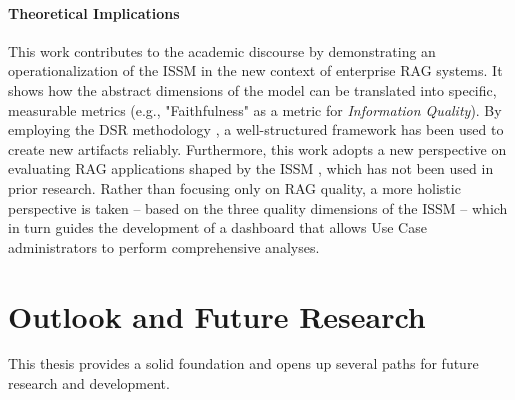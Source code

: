 \documentclass[
	english,
	ruledheaders=section,%
	class=report,%
	thesis={type=bachelor},%
	accentcolor=1b,%
	custommargins=true,%
	marginpar=false,%
	parskip=half-,%
	fontsize=11pt,%
	DIV=14,
]{tudapub}
\begin{document}
\paragraph{Theoretical Implications} This work contributes to the academic discourse by demonstrating an operationalization of the ISSM \parencite{DeloneMcLean2003ISSuccessTenYearUpdate} in the new context of enterprise RAG systems. It shows how the abstract dimensions of the model can be translated into specific, measurable metrics (e.g., "Faithfulness" as a metric for \textit{Information Quality}). By employing the DSR methodology \parencite{Peffers2007}, a well-structured framework has been used to create new artifacts reliably. Furthermore, this work adopts a new perspective on evaluating RAG applications shaped by the ISSM \parencite{DeloneMcLean2003ISSuccessTenYearUpdate}, which has not been used in prior research. Rather than focusing only on RAG quality, a more holistic perspective is taken -- based on the three quality dimensions of the ISSM \parencite{DeloneMcLean2003ISSuccessTenYearUpdate} -- which in turn guides the development of a dashboard that allows Use Case administrators to perform comprehensive analyses.
\section{Outlook and Future Research}
This thesis provides a solid foundation and opens up several paths for future research and development.
\end{document}

